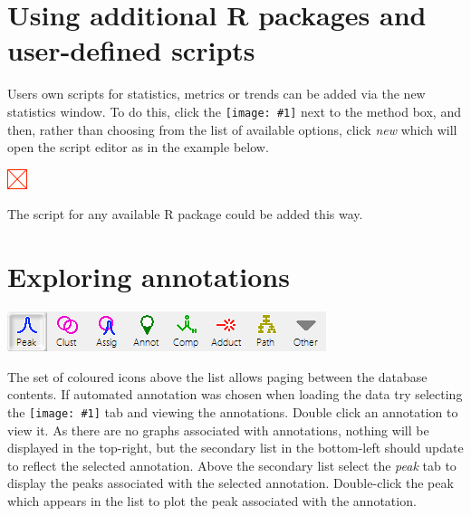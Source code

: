 \documentclass[11pt,a4paper]{article}
\newcommand{\menu}[1]{ \flqq\textit{#1}\frqq}
\newcommand{\icon}[1]{\texttt{[image: \#1]}}
\begin{document}
\section{Using additional R packages and user-defined scripts}

Users own scripts for statistics, metrics or trends can be added via the new statistics window. To do this, click the \icon{database} next to the method box, and then, rather than choosing from the list of available options, click \menu{new} which will open the script editor as in the example below. 

\begin{center}
	\includegraphics[max width=0.7\linewidth]{"Images/userguide/newscript"}
\end{center}

The script for any available R package could be added this way. 

\section{Exploring annotations}
\begin{center}
	\includegraphics{"Images/userguide/database contents"} 
\end{center}
The set of coloured icons above the list allows paging between the database contents. If automated annotation was chosen when loading the data try selecting the \icon{annot}
 tab and viewing the annotations.
 Double click an annotation to view it. As there are no graphs associated with annotations, nothing will be displayed in the top-right, but the secondary list in the bottom-left should update to reflect the selected annotation. Above the secondary list select the \menu{peak} tab to display the peaks associated with the selected annotation. Double-click the peak which appears in the list to plot the peak associated with the annotation.
\end{document}
